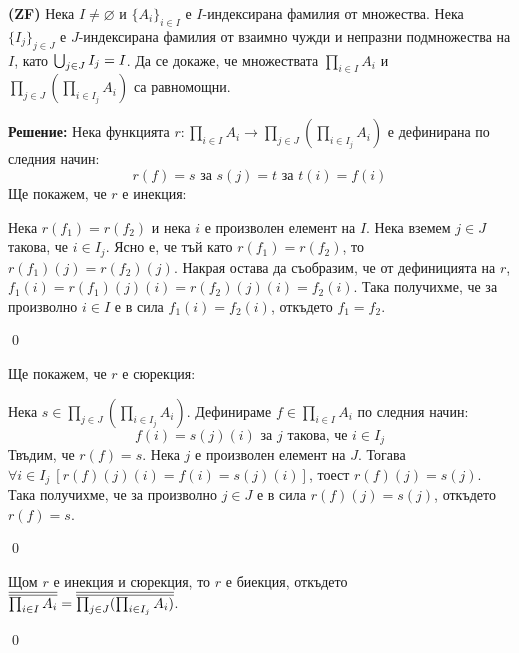 \begin{problem}
\textbf{(ZF)}
Нека $I \ne \varnothing$ и $\{A_i\}_{i \in I}$ е $I$-индексирана фамилия от множества.
Нека $\{I_j\}_{j \in J}$ е $J$-индексирана фамилия от взаимно чужди и непразни подмножества на $I$,
като $\bigcup_{j \in J} I_j = I$.
Да се докаже, че множествата
$\prod_{i \in I} A_i$ и $\prod_{j \in J}(\prod_{i \in I_j} A_i)$ са равномощни.
\end{problem}

\textbf{Решение:}
\smallbreak
\quad
Нека функцията $r: \prod_{i \in I} A_i \to \prod_{j \in J}(\prod_{i \in I_j} A_i)$ е дефинирана по следния начин:
\[
r(f) = s \text{ за }
s(j) = t \text{ за }
t(i) = f(i)
\]
\quad
Ще покажем, че $r$ е инекция:

\begin{tcolorbox}[mybox={Доказателство:}]
\quad
Нека $r(f_1) = r(f_2)$ и нека $i$ е произволен елемент на $I$.
Нека вземем $j \in J$ такова, че $i \in I_j$.
Ясно е, че тъй като $r(f_1) = r(f_2)$, то $r(f_1)(j) = r(f_2)(j)$.
Накрая остава да съобразим, че от дефиницията на $r$,
$f_1(i) = r(f_1)(j)(i) = r(f_2)(j)(i) = f_2(i)$.
Така получихме, че за произволно $i \in I$ е в сила $f_1(i) = f_2(i)$, откъдето
$f_1 = f_2$.

\qed
\end{tcolorbox}

\quad
Ще покажем, че $r$ е сюрекция:

\begin{tcolorbox}[mybox={Доказателство:}]
\quad
Нека $s \in \prod_{j \in J}(\prod_{i \in I_j} A_i)$.
Дефинираме $f \in \prod_{i \in I} A_i$ по следния начин:
\[
f(i) = s(j)(i) \text{ за $j$ такова, че } i \in I_j
\]
\quad
Твъдим, че $r(f) = s$. Нека $j$ е произволен елемент на $J$.
Тогава $\forall i \in I_j\ [r(f)(j)(i) = f(i) = s(j)(i)]$, тоест $r(f)(j) = s(j)$.
Така получихме, че за произволно $j \in J$ е в сила
$r(f)(j) = s(j)$, откъдето $r(f) = s$.

\qed
\end{tcolorbox}


\quad
Щом $r$ е инекция и сюрекция, то $r$ е биекция, откъдето
$\overline{\overline{\prod_{i \in I} A_i}} = \overline{\overline{\prod_{j \in J}(\prod_{i \in I_j} A_i)}}$.

\qed
